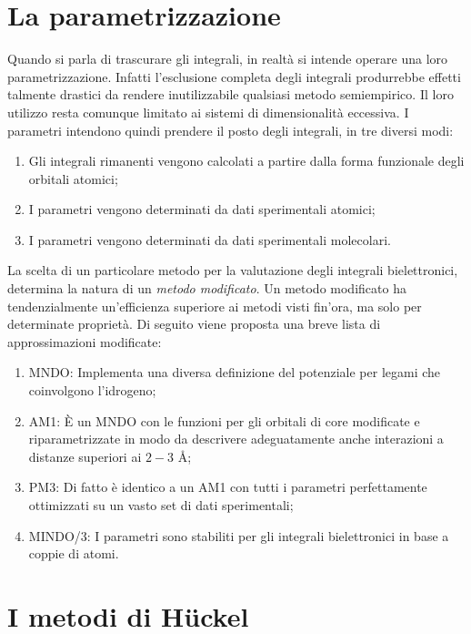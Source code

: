 \documentclass[oneside]{amsbook}
\numberwithin{section}{chapter}
\numberwithin{equation}{section}
\numberwithin{figure}{section}
\begin{document}
\section{La parametrizzazione}
Quando si parla di trascurare gli integrali, in realtà si intende operare una loro parametrizzazione. Infatti l'esclusione completa degli integrali produrrebbe effetti talmente drastici da rendere inutilizzabile qualsiasi metodo semiempirico. Il loro utilizzo resta comunque limitato ai sistemi di dimensionalità eccessiva.
I parametri intendono quindi prendere il posto degli integrali, in tre diversi modi:
\begin{enumerate}
\item Gli integrali rimanenti vengono calcolati a partire dalla forma funzionale degli orbitali atomici;
\item I parametri vengono determinati da dati sperimentali atomici;
\item  I parametri vengono determinati da dati sperimentali molecolari.
\end{enumerate}
La scelta di un particolare metodo per la valutazione degli integrali bielettronici, determina la natura di un \emph{metodo modificato}. Un metodo modificato ha tendenzialmente un'efficienza superiore ai metodi visti fin'ora, ma solo per determinate proprietà.
Di seguito viene proposta una breve lista di approssimazioni modificate:
\begin{enumerate}
\item MNDO: Implementa una diversa definizione del potenziale per legami che coinvolgono l'idrogeno;
\item AM1: È un MNDO con le funzioni per gli orbitali di core modificate e riparametrizzate in modo da descrivere adeguatamente anche interazioni a distanze superiori ai $2-3$ \r{A};
\item PM3: Di fatto è identico a un AM1 con tutti i parametri perfettamente ottimizzati su un vasto set di dati sperimentali;
\item MINDO/3: I parametri sono stabiliti per gli integrali bielettronici in base a coppie di atomi.
\end{enumerate}
\section{I metodi di H\"uckel}
\end{document}
